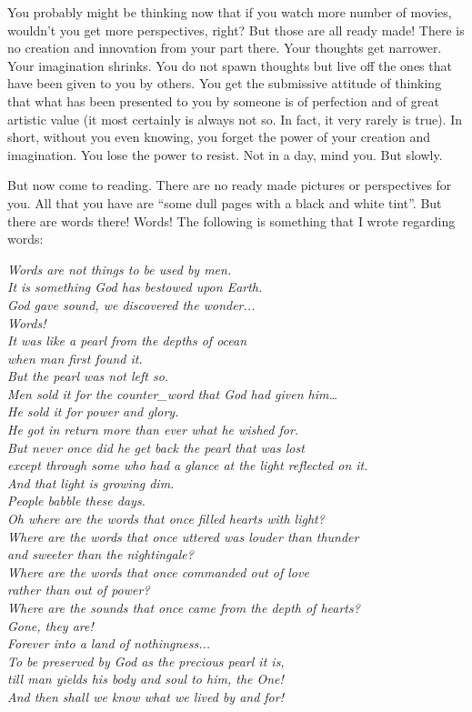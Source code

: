 \documentclass[twoside,11pt,titlepage]{article}
\begin{document}
You probably might be thinking now that if you watch more number of movies, wouldn't you get more perspectives, right? But those are all ready made! There is no creation and innovation from your part there. Your thoughts get narrower. Your imagination shrinks. You do not spawn thoughts but live off the ones that have been given to you by others. You get the submissive attitude of thinking that what has been presented to you by someone is of perfection and of great artistic value (it most certainly is always not so. In fact, it very rarely is true). In short, without you even knowing, you forget the power of your creation and imagination. You lose the power to resist. Not in a day, mind you. But slowly.

But now come to reading. There are no ready made pictures or perspectives for you. All that you have are ``some dull pages with a black and white tint''. But there are words there! Words! The following is something that I wrote regarding words:

\emph{Words are not things to be used by men.\\It is something God has bestowed upon Earth.\\God gave sound, we discovered the wonder...\\Words!\\It was like a pearl from the depths of ocean\\when man first found it.\\But the pearl was not left so.\\Men sold it for the counter\_word that God had given him…\\He sold it for power and glory.\\He got in return more than ever what he wished for.\\But never once did he get back the pearl that was lost\\except through some who had a glance at the light reflected on it.\\And that light is growing dim.\\People babble these days.\\Oh where are the words that once filled hearts with light?\\Where are the words that once uttered was louder than thunder\\and sweeter than the nightingale?\\Where are the words that once commanded out of love\\rather than out of power?\\Where are the sounds that once came from the depth of hearts?\\Gone, they are!\\Forever into a land of nothingness...\\To be preserved by God as the precious pearl it is,\\till man yields his body and soul to him, the One!\\And then shall we know what we lived by and for!}
\end{document}
